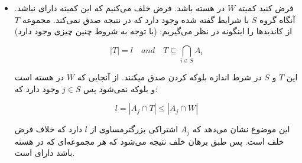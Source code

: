\documentclass[12pt]{article}
\begin{document}
\begin{enumerate}
{\begin{itemize}
{                اما مثال‌هایی هم وجود دارد که در 
                صدق می‌کنند، ولی در 
                نه. 
                برای مثال فرض کنید
                $8$
                رای‌دهنده، $7$کاندید و
                $k=4$
                باشد.
                برای هر $1\le i < j \le 4$
                یک بازیکن باشد که مجموعه موردتاییدش برابر
                $\{c_i, c_j, c_5, c_6, c_7\}$
                (در کل $6$ بازیکن)
                و $2$ بازیکن دیگر هم 
                مجموعه
                $\{c_1, c_2, c_3, c_4\}$
                را قبول داشته باشند. در این بازی کمیته
                $\{c_1, c_2, c_3, c_4\}$
                دارای 
                است. (این موضوع به سادگی قابل بررسی است)
                اما اگر $6$ بازیکن اول را درنظر بگیریم،
                تعداد و اشتراک آنها شرایط
                برای
                $l = 3$
                را ارضا می‌کند، اما در بین آنها کسی نیست که
                اشتراکش با کمیته نهایی حداقل 
                $3$
                باشد. پس این کمیته دارای
                نیست.


                بنابراین
                از
                قوی‌تر است.
            }
            \item {
                فرض کنید کمیته $W$
                در هسته باشد. فرض خلف می‌کنیم که این کمیته دارای 
                نباشد. آنگاه
                گروه 
                $S$
                با شرایط گفته شده وجود دارد که در نتیجه
                صدق نمی‌کند.
                مجموعه $T$
                از کاندیدها را اینگونه در نظر می‌گیریم:
                (با توجه به شروط  چنین چیزی وجود دارد)

                \[
                |T| = l \quad and \quad T \subseteq \bigcap_{i \in S} A_i 
                \]

                این $T$
                و
                $S$
                در شرط اندازه بلوکه کردن صدق میکنند.
                از آنجایی که $W$
                در هسته است و بلوکه نمی‌شود پس 
                $j \in S$
                وجود دارد که:

                \[
                l = \left| A_j \cap T\right| \le \left|A_j \cap W\right|
                \]

                این موضوع نشان می‌دهد که $A_j$
                اشتراکی بزرگترمساوی از $l$
                دارد
                که خلاف فرض خلف است. پس طبق برهان خلف نتیجه می‌شود که هر 
                مجموعه‌ای که در هسته باشد دارای
                است.

}
\end{itemize}}
\end{enumerate}
\end{document}
